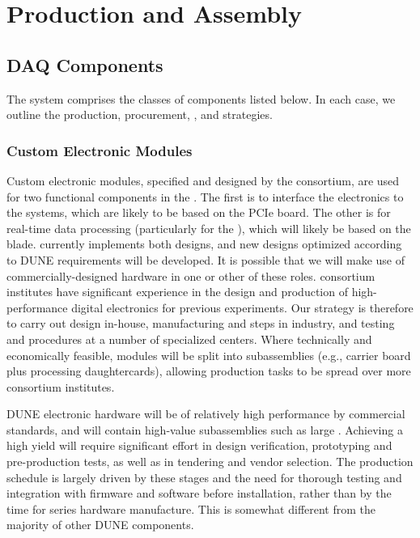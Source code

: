 
\section{Production and Assembly}
\label{sec:fd-daq-prod-assy}

\subsection{DAQ Components}

The   system comprises the classes of components listed below. In each case, we outline the production, procurement, , and  strategies.

\subsubsection{Custom Electronic Modules}

Custom electronic modules, specified and designed by the 
consortium, are used for two functional components in the 
. 
The first is to interface the  electronics to the   systems, which are likely to be based on the 
PCIe board.
The other is for real-time data processing (particularly for the
), which will likely be based on the
  blade.
 currently implements both designs, and new designs optimized according to
DUNE requirements will be developed.
It is possible that we will make use of commercially-designed hardware
in one or other of these roles.  consortium institutes have
significant experience in the design and production of high-performance digital electronics for previous experiments.
Our strategy is therefore to carry out design in-house, manufacturing
and  steps in industry, and testing and  procedures at a number of
specialized centers.
Where technically and economically feasible, modules will be split
into subassemblies (e.g., carrier board plus processing
daughtercards), allowing production tasks to be spread over more
consortium institutes.

DUNE electronic hardware will be of relatively high performance by commercial standards, and will contain high-value subassemblies such as large . Achieving a high yield will require significant effort in design verification, prototyping and pre-production tests, as well as in tendering and vendor selection. The production schedule is largely driven by these stages and the need for thorough testing and integration with firmware and software before installation, rather than by the time for series hardware manufacture. This is somewhat different from the majority of other DUNE  components.

